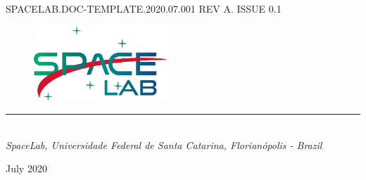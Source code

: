 %
%
%
%
%

%
%
%
%
%
%

\begin{titlepage}

\thispagestyle{empty}

\begin{flushleft}
SPACELAB.DOC-TEMPLATE.2020.07.001 REV A. ISSUE 0.1
\end{flushleft}

\begin{figure}[!ht]
    \begin{flushleft}
        \includegraphics[width=5cm]{figures/LogotipoSpaceLab.png}
    \end{flushleft}
\end{figure}

\begin{flushleft}
\Huge{\textbf{\thetitle}}
\rule[0pt]{\textwidth}{5pt}
\end{flushleft}

\vspace{0.2cm}

\begin{flushleft}
\textit{\thetitle} \\
\textit{SpaceLab, Universidade Federal de Santa Catarina, Florianópolis - Brazil}
\end{flushleft}

\vfill
\vfill

\begin{flushright}
July 2020
\end{flushright}

\end{titlepage}
